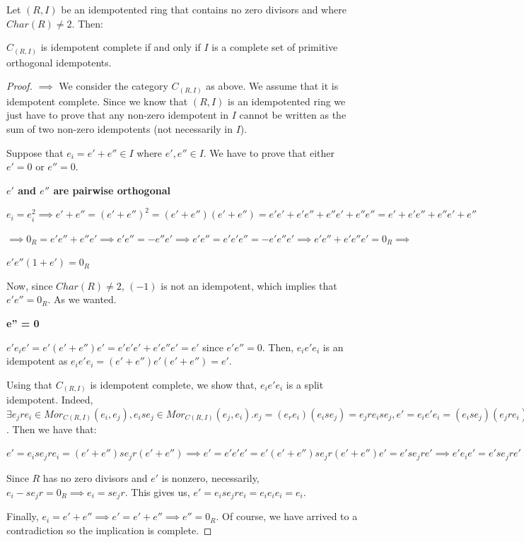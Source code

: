 \begin{proposition}
Let $(R,I)$ be an idempotented ring that contains no zero divisors and where $Char(R) \neq 2$. Then:

$C_{(R,I)}$ is idempotent complete if and only if $I$ is a complete set of primitive orthogonal idempotents.
\end{proposition}
\begin{proof}
$\implies$ We consider the category $C_{(R,I)}$ as above. We assume that it is idempotent complete. Since we know that $(R,I)$ is an idempotented ring we just have to prove that any non-zero idempotent in $I$ cannot be written as the sum of two non-zero idempotents (not necessarily in $I$). 

Suppose that $e_i = e'+e'' \in I$ where $e',e'' \in I$.  We have to prove that either $e' = 0$ or $e'' = 0$. 

\textbf{$e'$ and $e''$ are pairwise orthogonal}

$e_i = e_i^2 \implies e'+e'' = (e'+e'')^2 = (e'+e'')(e'+e'') = e'e'+e'e''+e''e'+e''e'' = e'+e'e''+e''e'+e''$

$\implies 0_R = e'e''+e''e' \implies e'e''=-e''e' \implies e'e'' = e'e'e''=-e'e''e' \implies e'e''+e'e''e' = 0_R \implies$

 $e'e''(1+e') = 0_R$

Now, since $Char(R) \neq 2$, $(-1)$ is not an idempotent, which implies that $e'e'' = 0_R$. As we wanted. 

\textbf{e'' = 0}

$e'e_ie' = e'(e'+e'')e' = e'e'e'+e'e''e' = e'$ since $e'e'' = 0$. Then, $e_ie'e_i$ is an idempotent as $e_ie'e_i = (e'+e'')e'(e'+e'') = e'$. 

Using that $C_{(R,I)}$ is idempotent complete, we show that, $e_ie'e_i$ is a split idempotent. Indeed, $\exists e_jre_i \in Mor_{C(R,I)}(e_i,e_j),e_ise_j \in Mor_{C(R,I)}(e_j,e_i).e_j = (e_re_i)(e_ise_j) = e_jre_ise_j,e' = e_ie'e_i = (e_ise_j)(e_jre_i) = e_ise_jre_i$. Then we have that:

$e' = e_ise_jre_i =(e'+e'')se_jr(e'+e'') \implies e' = e'e'e' = e'(e'+e'')se_jr(e'+e'')e' = e'se_jre' \implies e'e_ie' = e'se_jre' \implies e'e_ie' - e'se_jre' = 0_R \implies e'(e_i-se_jr)e' = 0_R$

Since $R$ has no zero divisors and $e'$ is nonzero, necessarily, $e_i-se_jr = 0_R \implies e_i = se_jr$. This gives us, $e' = e_ise_jre_i = e_ie_ie_i = e_i$.

Finally, $e_i = e'+e'' \implies e' = e'+e'' \implies e'' = 0_R$. Of course, we have arrived to a contradiction so the implication is complete.


\end{proof}
